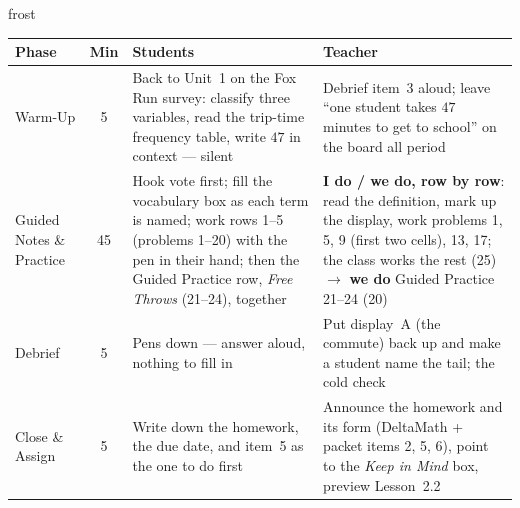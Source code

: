 \documentclass[10pt]{article}
\begin{document}
\begin{fixedskillbox}{frost}
\renewcommand{\arraystretch}{1.25}
\begin{tabularx}{\linewidth}{@{}l c X X@{}}
\textbf{Phase} & \textbf{Min} & \textbf{Students} & \textbf{Teacher} \\
\hline
Warm-Up & 5 & Back to Unit~1 on the Fox Run survey: classify three variables, read the trip-time
  frequency table, write $47$ in context --- silent & Debrief item~3 aloud; leave ``one student
  takes $47$ minutes to get to school'' on the board all period \\
Guided Notes \& Practice & 45 & Hook vote first; fill the vocabulary box as each term is named;
  work rows 1--5 (problems 1--20) with the pen in their hand; then the Guided Practice row,
  \emph{Free Throws} (21--24), together & \textbf{I do / we do, row by row}: read the definition,
  mark up the display, work problems 1, 5, 9 (first two cells), 13, 17; the class works the rest
  (25) $\to$ \textbf{we do} Guided Practice 21--24 (20) \\
Debrief & 5 & Pens down --- answer aloud, nothing to fill in & Put display~A (the commute) back
  up and make a student name the tail; the cold check \\
Close \& Assign & 5 & Write down the homework, the due date, and item~5 as the one to do first &
  Announce the homework and its form (DeltaMath + packet items 2, 5, 6), point to the \emph{Keep in Mind} box, preview
  Lesson~2.2 \\
\end{tabularx}
\end{fixedskillbox}
\end{document}

